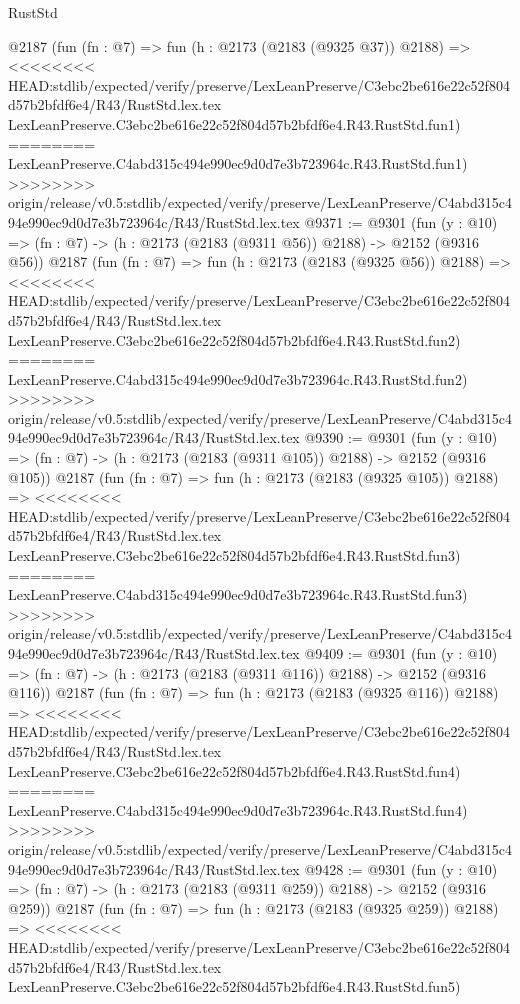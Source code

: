 \begin{lexlean}{RustStd}
\begin{coremodule}
{\begin{coremodule}
{{{{{{{{{{{{{{{    @2187
    (fun (fn : @7) =>
    fun (h : @2173 (@2183 (@9325 @37)) @2188) =>
<<<<<<<< HEAD:stdlib/expected/verify/preserve/LexLeanPreserve/C3ebc2be616e22c52f804d57b2bfdf6e4/R43/RustStd.lex.tex
    LexLeanPreserve.C3ebc2be616e22c52f804d57b2bfdf6e4.R43.RustStd.fun1)
========
    LexLeanPreserve.C4abd315c494e990ec9d0d7e3b723964c.R43.RustStd.fun1)
>>>>>>>> origin/release/v0.5:stdlib/expected/verify/preserve/LexLeanPreserve/C4abd315c494e990ec9d0d7e3b723964c/R43/RustStd.lex.tex
@9371 := @9301
    (fun (y : @10) => (fn : @7) -> (h : @2173 (@2183 (@9311 @56)) @2188) -> @2152 (@9316 @56))
    @2187
    (fun (fn : @7) =>
    fun (h : @2173 (@2183 (@9325 @56)) @2188) =>
<<<<<<<< HEAD:stdlib/expected/verify/preserve/LexLeanPreserve/C3ebc2be616e22c52f804d57b2bfdf6e4/R43/RustStd.lex.tex
    LexLeanPreserve.C3ebc2be616e22c52f804d57b2bfdf6e4.R43.RustStd.fun2)
========
    LexLeanPreserve.C4abd315c494e990ec9d0d7e3b723964c.R43.RustStd.fun2)
>>>>>>>> origin/release/v0.5:stdlib/expected/verify/preserve/LexLeanPreserve/C4abd315c494e990ec9d0d7e3b723964c/R43/RustStd.lex.tex
@9390 := @9301
    (fun (y : @10) => (fn : @7) -> (h : @2173 (@2183 (@9311 @105)) @2188) -> @2152 (@9316 @105))
    @2187
    (fun (fn : @7) =>
    fun (h : @2173 (@2183 (@9325 @105)) @2188) =>
<<<<<<<< HEAD:stdlib/expected/verify/preserve/LexLeanPreserve/C3ebc2be616e22c52f804d57b2bfdf6e4/R43/RustStd.lex.tex
    LexLeanPreserve.C3ebc2be616e22c52f804d57b2bfdf6e4.R43.RustStd.fun3)
========
    LexLeanPreserve.C4abd315c494e990ec9d0d7e3b723964c.R43.RustStd.fun3)
>>>>>>>> origin/release/v0.5:stdlib/expected/verify/preserve/LexLeanPreserve/C4abd315c494e990ec9d0d7e3b723964c/R43/RustStd.lex.tex
@9409 := @9301
    (fun (y : @10) => (fn : @7) -> (h : @2173 (@2183 (@9311 @116)) @2188) -> @2152 (@9316 @116))
    @2187
    (fun (fn : @7) =>
    fun (h : @2173 (@2183 (@9325 @116)) @2188) =>
<<<<<<<< HEAD:stdlib/expected/verify/preserve/LexLeanPreserve/C3ebc2be616e22c52f804d57b2bfdf6e4/R43/RustStd.lex.tex
    LexLeanPreserve.C3ebc2be616e22c52f804d57b2bfdf6e4.R43.RustStd.fun4)
========
    LexLeanPreserve.C4abd315c494e990ec9d0d7e3b723964c.R43.RustStd.fun4)
>>>>>>>> origin/release/v0.5:stdlib/expected/verify/preserve/LexLeanPreserve/C4abd315c494e990ec9d0d7e3b723964c/R43/RustStd.lex.tex
@9428 := @9301
    (fun (y : @10) => (fn : @7) -> (h : @2173 (@2183 (@9311 @259)) @2188) -> @2152 (@9316 @259))
    @2187
    (fun (fn : @7) =>
    fun (h : @2173 (@2183 (@9325 @259)) @2188) =>
<<<<<<<< HEAD:stdlib/expected/verify/preserve/LexLeanPreserve/C3ebc2be616e22c52f804d57b2bfdf6e4/R43/RustStd.lex.tex
    LexLeanPreserve.C3ebc2be616e22c52f804d57b2bfdf6e4.R43.RustStd.fun5)
}}}}}}}}}}}}}}}
\end{coremodule}}
\end{coremodule}
\end{lexlean}
